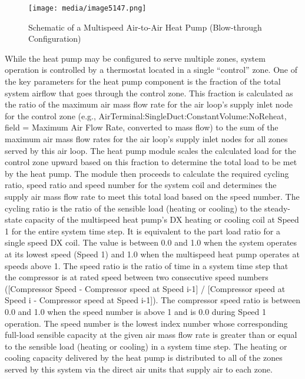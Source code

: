 \begin{figure}[hbtp] %
\centering
\texttt{[image: media/image5147.png]}
\caption{Schematic of a Multispeed Air-to-Air Heat Pump (Blow-through Configuration) \protect \label{fig:schematic-of-a-multispeed-air-to-air-heat}}
\end{figure}

While the heat pump may be configured to serve multiple zones, system operation is controlled by a thermostat located in a single ``control'' zone. One of the key parameters for the heat pump component is the fraction of the total system airflow that goes through the control zone. This fraction is calculated as the ratio of the maximum air mass flow rate for the air loop's supply inlet node for the control zone (e.g., AirTerminal:SingleDuct:ConstantVolume:NoReheat, field = Maximum Air Flow Rate, converted to mass flow) to the sum of the maximum air mass flow rates for the air loop's supply inlet nodes for all zones served by this air loop. The heat pump module scales the calculated load for the control zone upward based on this fraction to determine the total load to be met by the heat pump. The module then proceeds to calculate the required cycling ratio, speed ratio and speed number for the system coil and determines the supply air mass flow rate to meet this total load based on the speed number. The cycling ratio is the ratio of the sensible load (heating or cooling) to the steady-state capacity of the multispeed heat pump's DX heating or cooling coil at Speed 1 for the entire system time step. It is equivalent to the part load ratio for a single speed DX coil. The value is between 0.0 and 1.0 when the system operates at its lowest speed (Speed 1) and 1.0 when the multispeed heat pump operates at speeds above 1. The speed ratio is the ratio of time in a system time step that the compressor is at rated speed between two consecutive speed numbers ({[}Compressor Speed - Compressor speed at Speed i-1{]} / {[}Compressor speed at Speed i - Compressor speed at Speed i-1{]}). The compressor speed ratio is between 0.0 and 1.0 when the speed number is above 1 and is 0.0 during Speed 1 operation. The speed number is the lowest index number whose corresponding full-load sensible capacity at the given air mass flow rate is greater than or equal to the sensible load (heating or cooling) in a system time step. The heating or cooling capacity delivered by the heat pump is distributed to all of the zones served by this system via the direct air units that supply air to each zone.

